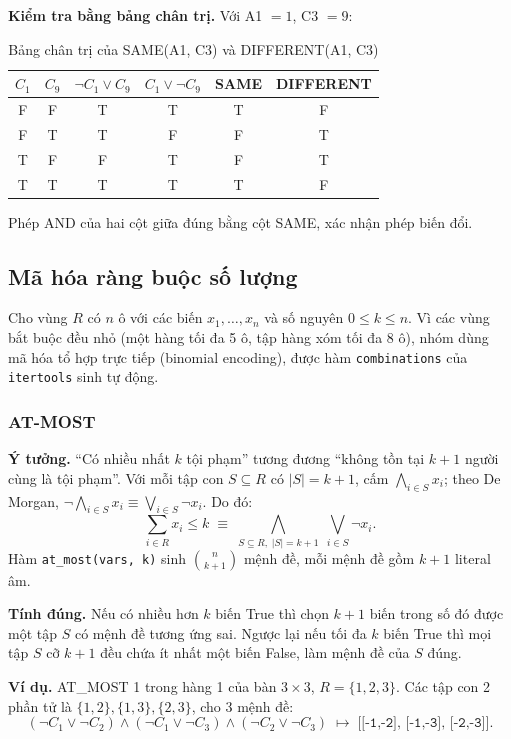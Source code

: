 \textbf{Kiểm tra bằng bảng chân trị.} Với A1 $=1$, C3 $=9$:

\begin{table}[H]
\centering
\begin{tabular}{cccccc}
\toprule
$C_1$ & $C_9$ & $\neg C_1 \vee C_9$ & $C_1 \vee \neg C_9$ & SAME & DIFFERENT \\
\midrule
F & F & T & T & T & F \\
F & T & T & F & F & T \\
T & F & F & T & F & T \\
T & T & T & T & T & F \\
\bottomrule
\end{tabular}
\caption{Bảng chân trị của SAME(A1, C3) và DIFFERENT(A1, C3)}
\end{table}

Phép AND của hai cột giữa đúng bằng cột SAME, xác nhận phép biến đổi.

\subsection{Mã hóa ràng buộc số lượng}
\label{sec:cnf-count}
Cho vùng $R$ có $n$ ô với các biến $x_1,\dots,x_n$ và số nguyên
$0 \le k \le n$. Vì các vùng bắt buộc đều nhỏ (một hàng tối đa 5 ô, tập hàng
xóm tối đa 8 ô), nhóm dùng mã hóa tổ hợp trực tiếp (binomial encoding),
được hàm \texttt{combinations} của \texttt{itertools} sinh tự động.

\subsubsection{AT-MOST}
\textbf{Ý tưởng.} ``Có nhiều nhất $k$ tội phạm'' tương đương ``không tồn tại
$k+1$ người cùng là tội phạm''. Với mỗi tập con $S \subseteq R$ có $|S| = k+1$,
cấm $\bigwedge_{i\in S} x_i$; theo De Morgan,
$\neg\bigwedge_{i\in S} x_i \equiv \bigvee_{i\in S}\neg x_i$. Do đó:
\[
\textstyle\sum_{i\in R} x_i \le k
\;\equiv\;
\bigwedge_{S\subseteq R,\;|S|=k+1}\;\bigvee_{i\in S}\neg x_i .
\]
Hàm \texttt{at\_most(vars, k)} sinh $\binom{n}{k+1}$ mệnh đề, mỗi mệnh đề gồm
$k+1$ literal âm.

\textbf{Tính đúng.} Nếu có nhiều hơn $k$ biến True thì chọn $k+1$ biến trong
số đó được một tập $S$ có mệnh đề tương ứng sai. Ngược lại nếu tối đa $k$ biến
True thì mọi tập $S$ cỡ $k+1$ đều chứa ít nhất một biến False, làm mệnh đề
của $S$ đúng.

\textbf{Ví dụ.} AT\_MOST 1 trong hàng 1 của bàn $3\times3$, $R=\{1,2,3\}$.
Các tập con 2 phần tử là $\{1,2\},\{1,3\},\{2,3\}$, cho 3 mệnh đề:
\[
(\neg C_1 \vee \neg C_2) \wedge (\neg C_1 \vee \neg C_3) \wedge (\neg C_2 \vee \neg C_3)
\;\mapsto\; \texttt{[[-1,-2], [-1,-3], [-2,-3]]}.
\]

